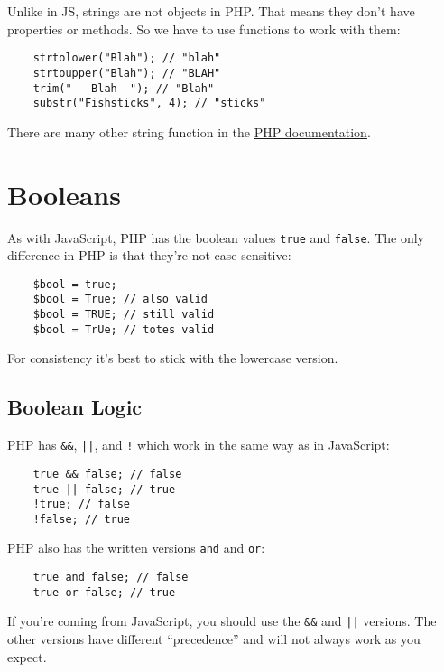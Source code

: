 Unlike in JS, strings are not objects in PHP. That means they don't have properties or methods. So we have to use functions to work with them:

\begin{verbatim}
    strtolower("Blah"); // "blah"
    strtoupper("Blah"); // "BLAH"
    trim("   Blah  "); // "Blah"
    substr("Fishsticks", 4); // "sticks"
\end{verbatim}

There are many other string function in the \href{http://www.php.net/manual/en/ref.strings.php}{PHP documentation}.


\pagebreak


\section{Booleans}

As with JavaScript, PHP has the boolean values \texttt{true} and \texttt{false}. The only difference in PHP is that they're not case sensitive:

\begin{verbatim}
    $bool = true;
    $bool = True; // also valid
    $bool = TRUE; // still valid
    $bool = TrUe; // totes valid
\end{verbatim}

For consistency it's best to stick with the lowercase version.

\subsection{Boolean Logic}

PHP has \texttt{\&\&}, \texttt{||}, and \texttt{!} which work in the same way as in JavaScript:

\begin{verbatim}
    true && false; // false
    true || false; // true
    !true; // false
    !false; // true
\end{verbatim}

PHP also has the written versions \texttt{and} and \texttt{or}:

\begin{verbatim}
    true and false; // false
    true or false; // true
\end{verbatim}

If you're coming from JavaScript, you should use the \texttt{\&\&} and \texttt{||} versions. The other versions have different ``precedence'' and will not always work as you expect.


